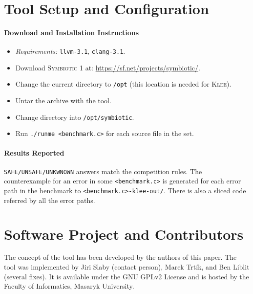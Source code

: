 \documentclass[10pt]{llncs}
\newcommand\tool{\textsc{Symbiotic}\xspace}
\begin{document}

\section{Tool Setup and Configuration}
\paragraph{Download and Installation Instructions}
\begin{itemize}
\item \emph{Requirements:} \texttt{llvm-3.1}, \texttt{clang-3.1}.
\item Download \tool 1 at: \url{https://sf.net/projects/symbiotic/}.
\item Change the current directory to \texttt{/opt} (this location is
	needed for \textsc{Klee}).
\item Untar the archive with the tool.
\item Change directory into \texttt{/opt/symbiotic}.
\item Run \texttt{./runme <benchmark.c>} for each source file in the set.
\end{itemize}

\paragraph{Results Reported} \texttt{SAFE/UNSAFE/UNKWNOWN} answers match
the competition rules. The counterexample for an error in some
\texttt{<benchmark.c>} is generated for each error path in the benchmark to
\texttt{<benchmark.c>-klee-out/}. There is also a sliced code referred by all
the error paths.


\section{Software Project and Contributors}
The concept of the tool has been developed by the authors of this paper. The
tool was implemented by Jiri Slaby (contact person), Marek Trt\'ik, and Ben
Liblit (several fixes).  It is available under the GNU GPLv2 License and is
hosted by the Faculty of Informatics, Masaryk University.





\end{document}
